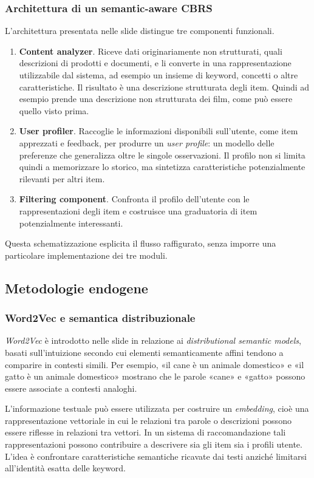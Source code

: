 \subsubsection{Architettura di un semantic-aware CBRS}
L'architettura presentata nelle slide distingue tre componenti funzionali.
\begin{enumerate}
    \item \textbf{Content analyzer}. Riceve dati originariamente non strutturati, quali descrizioni di prodotti e documenti, e li converte in una rappresentazione utilizzabile dal sistema, ad esempio un insieme di keyword, concetti o altre caratteristiche. Il risultato è una descrizione strutturata degli item.
    Quindi ad esempio prende una descrizione non strutturata dei film, come può essere quello visto prima.
    \item \textbf{User profiler}. Raccoglie le informazioni disponibili sull'utente, come item apprezzati e feedback, per produrre un \emph{user profile}: un modello delle preferenze che generalizza oltre le singole osservazioni. Il profilo non si limita quindi a memorizzare lo storico, ma sintetizza caratteristiche potenzialmente rilevanti per altri item.
    \item \textbf{Filtering component}. Confronta il profilo dell'utente con le rappresentazioni degli item e costruisce una graduatoria di item potenzialmente interessanti.
\end{enumerate}

Questa schematizzazione esplicita il flusso raffigurato, senza imporre una particolare implementazione dei tre moduli.

\subsection{Metodologie endogene}

\subsubsection{Word2Vec e semantica distribuzionale}
\emph{Word2Vec} è introdotto nelle slide in relazione ai \emph{distributional semantic models}, basati sull'intuizione secondo cui elementi semanticamente affini tendono a comparire in contesti simili. Per esempio, «il cane è un animale domestico» e «il gatto è un animale domestico» mostrano che le parole «cane» e «gatto» possono essere associate a contesti analoghi.

L'informazione testuale può essere utilizzata per costruire un \emph{embedding}, cioè una rappresentazione vettoriale in cui le relazioni tra parole o descrizioni possono essere riflesse in relazioni tra vettori. In un sistema di raccomandazione tali rappresentazioni possono contribuire a descrivere sia gli item sia i profili utente. L'idea è confrontare caratteristiche semantiche ricavate dai testi anziché limitarsi all'identità esatta delle keyword.


